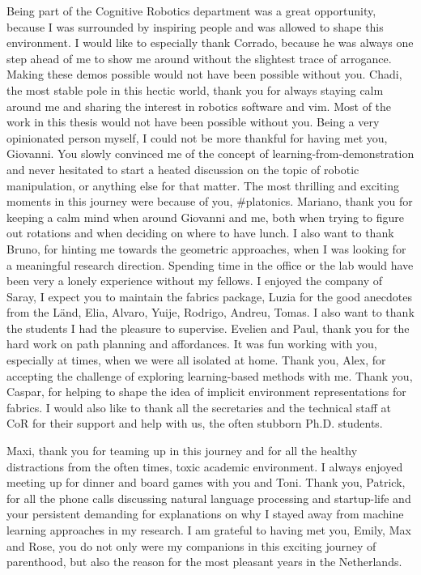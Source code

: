 Being part of the Cognitive Robotics department was a great opportunity,
because I was surrounded by inspiring people and was allowed to shape this
environment. I would like to especially thank Corrado, because he was always one
step ahead of me to show me around without the slightest trace of arrogance.
Making these demos possible would not have been possible without you. Chadi,
the most stable pole in this hectic world, thank you for always staying calm
around me and sharing the interest in robotics software and vim. Most of the
work in this thesis would not have been possible without you. Being a very
opinionated person myself, I could not be more thankful for having met you,
Giovanni. You slowly convinced me of the concept of learning-from-demonstration
and never hesitated to start a heated discussion on the topic of robotic
manipulation, or anything else for that matter. The most thrilling and exciting
moments in this journey were because of you, \#platonics. Mariano, thank you for
keeping a calm mind when around Giovanni and me, both when trying to figure out
rotations and when deciding on where to have lunch. I also want to thank Bruno,
for hinting me towards the geometric approaches, when I was looking for a
meaningful research direction. Spending time in the office or the lab would
have been very a lonely experience without my fellows. I enjoyed the company of
Saray, I expect you to maintain the fabrics package, Luzia for the good
anecdotes from the Länd, Elia, Alvaro, Yuije, Rodrigo, Andreu, Tomas.
I also want to thank the students I had the pleasure to supervise. Evelien and
Paul, thank you for the hard work on path planning and affordances. It was fun
working with you, especially at times, when we were all isolated at home. Thank you, Alex, for accepting the challenge of exploring learning-based methods with
me. Thank you, Caspar, for helping to shape the idea of implicit environment
representations for \ac{fabrics}. I would also like to thank all the
secretaries and the technical staff at CoR for their support and help with us, 
the often stubborn Ph.D. students.

Maxi, thank you for teaming up in this journey and for all the healthy
distractions from the often times, toxic academic environment. I always
enjoyed meeting up for dinner and board games with you and Toni. Thank you,
Patrick, for all the phone calls discussing natural language processing and
startup-life and your persistent demanding for explanations on why I stayed
away from machine learning approaches in my research. I am grateful to having
met you, Emily, Max and Rose, you do not only were my companions in this
exciting journey of parenthood, but also the reason for the most pleasant years
in the Netherlands.

